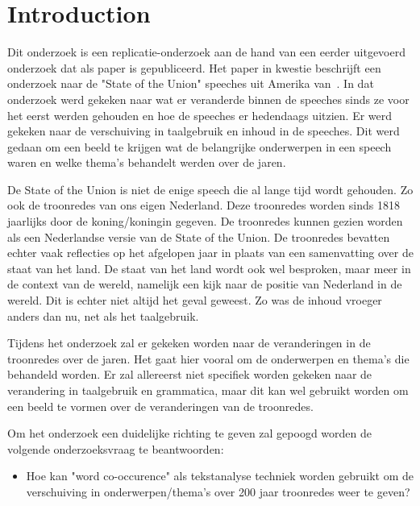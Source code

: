 \section{Introduction}
\label{sec:intro}

Dit onderzoek is een replicatie-onderzoek aan de hand van een eerder uitgevoerd onderzoek dat als paper is gepubliceerd. Het paper in kwestie beschrijft een onderzoek naar de "State of the Union" speeches uit Amerika van~\cite{state}. In dat onderzoek werd gekeken naar wat er veranderde binnen de speeches sinds ze voor het eerst werden gehouden en hoe de speeches er hedendaags uitzien. Er werd gekeken naar de verschuiving in taalgebruik en inhoud in de speeches. Dit werd gedaan om een beeld te krijgen wat de belangrijke onderwerpen in een speech waren en welke thema's behandelt  werden over de jaren. 

De State of the Union is niet de enige speech die al lange tijd wordt gehouden. Zo ook de troonredes van ons eigen Nederland. Deze troonredes worden sinds 1818 jaarlijks door de koning/koningin gegeven. De troonredes kunnen gezien worden als een Nederlandse versie van de State of the Union. De troonredes bevatten echter vaak reflecties op het afgelopen jaar in plaats van een samenvatting over de staat van het land. De staat van het land wordt ook wel besproken, maar meer in de context van de wereld, namelijk een kijk naar de positie van Nederland in de wereld. Dit is echter niet altijd het geval geweest. Zo was de inhoud vroeger anders dan nu, net als het taalgebruik.

Tijdens het onderzoek zal er gekeken worden naar de veranderingen in de troonredes over de jaren. Het gaat hier vooral om de onderwerpen en thema's die behandeld worden. Er zal allereerst niet specifiek worden gekeken naar de verandering in taalgebruik en grammatica, maar dit kan wel gebruikt worden om een beeld te vormen over de veranderingen van de troonredes.

Om het onderzoek een duidelijke richting te geven zal gepoogd worden de volgende onderzoeksvraag te beantwoorden:

\begin{itemize}
\item Hoe kan "word co-occurence" als tekstanalyse techniek worden gebruikt om de verschuiving in onderwerpen/thema's over 200 jaar troonredes weer te geven?
\end{itemize}

